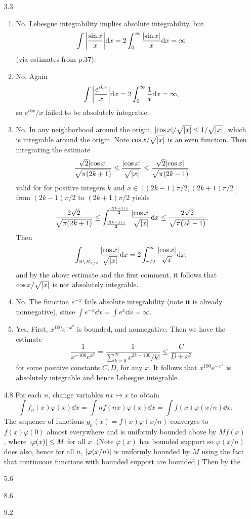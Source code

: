 \documentclass[11pt]{article}
\begin{document}
\begin{enumerate}
    \item[3.3] \begin{enumerate}
        \item No. Lebesgue integrability implies absolute integrability, but \[\int \abs{\frac{\sin x}{x}}\dd x = 2\int_0^\infty \frac{\abs{\sin x}}{x}\dd x = \infty\] (via estimates from p.37).
        \item No. Again \[\int \abs{\frac{e^{ikx}}{x}}\dd x = 2\int_0^\infty \frac{1}{x}\dd x=\infty ,\] so $e^{ikx}/x$ failed to be absolutely integrable.
        \item No. In any neighborhood around the origin, $\abs{ \cos x}/\sqrt{\abs{x}}\leq 1/\sqrt{\abs{x}}$, which is integrable around the origin. Note $\cos x/\sqrt{\abs{x}}$ is an even function. Then integrating the estimate \[\frac{\sqrt 2\abs{\cos x}}{\sqrt{\pi(2k+1)}}\leq \frac{\abs{\cos x}}{\sqrt{\abs{x}}}\leq \frac{\sqrt 2\abs{\cos x}}{\sqrt{\pi(2k-1)}}\] valid for for positive integers $k$ and $x\in [(2k-1)\pi/2,(2k+1)\pi/2]$ from $(2k-1)\pi/2$ to $(2k+1)\pi/2$ yields \[\frac{2\sqrt 2}{\sqrt{\pi(2k+1)}}\leq \int_{\frac{(2k-1)\pi}{2}}^{\frac{(2k+1)\pi}{2}}\frac{\abs{\cos x}}{\sqrt{\abs{x}}}\dd x\leq \frac{2\sqrt 2}{\sqrt{\pi(2k-1)}}.\] Then \[\int_{\mathbb{R}\setminus B_{\pi/2}} \frac{\abs{\cos x}}{\sqrt{\abs{x}}}\dd x = 2\int_{\pi/2}^\infty \frac{\abs{\cos x}}{\sqrt{x}}\dd x,\] and by the above estimate and the first comment, it follows that $\cos x /\sqrt{\abs{x}}$ is not absolutely integrable.
        \item No. The function $e^{-x}$ fails absolute integrability (note it is already nonnegative), since $\int e^{-x}\dd x = \int e^x \dd x = \infty$.
        \item Yes. First, $x^{100}e^{-x^2}$ is bounded, and nonnegative. Then we have the estimate \[\frac{1}{x^{-100}e^{x^2}} = \frac{1}{\sum_{k=0}^\infty x^{2k-100}/k!}\leq \frac{C}{D+x^2}\] for some positive constants $C,D$, for any $x$. It follows that $x^{100}e^{-x^2}$ is absolutely integrable and hence Lebesgue integrable.
    \end{enumerate}
    \item[4.8] For each $n$, change variables $nx\mapsto x$ to obtain \[\int f_n(x)\varphi(x)\dd x = \int nf(nx)\varphi(x)\dd x = \int f(x)\varphi(x/n)\dd x.\] The sequence of functions $g_n(x) = f(x)\varphi(x/n)$ converges to $f(x)\varphi(0)$ almost everywhere and is uniformly bounded above by $Mf(x)$, where $\abs{\varphi(x)}\leq M$ for all $x$. (Note $\varphi(x)$ has bounded support so $\varphi(x/n)$ does also, hence for all $n$, $\abs{\varphi(x/n)}$ is uniformly bounded by $M$ using the fact that continuous functions with bounded support are bounded.) Then by the 
    \item[5.6]
    \item[8.6]
    \item[9.2]
\end{enumerate}
\vspace*{7em}
\end{document}
